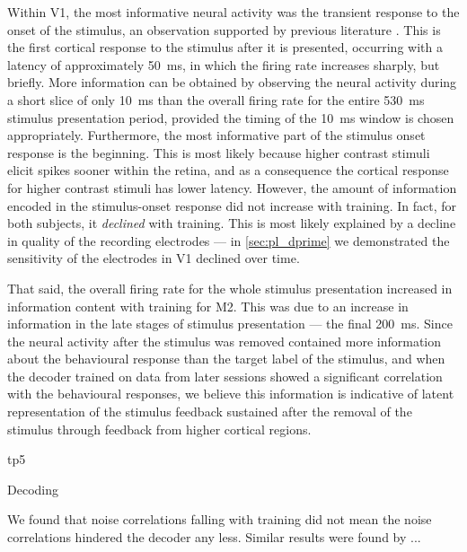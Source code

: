 Within \ac{V1}, the most informative neural activity was the transient response to the onset of the stimulus, an observation supported by previous literature \citep{Muller2001}.
This is the first cortical response to the stimulus after it is presented, occurring with a latency of approximately \SI{50}{\milli\second}, in which the firing rate increases sharply, but briefly.
More information can be obtained by observing the neural activity during a short slice of only \SI{10}{\milli\second} than the overall firing rate for the entire \SI{530}{\milli\second} stimulus presentation period, provided the timing of the \SI{10}{\milli\second} window is chosen appropriately.
Furthermore, the most informative part of the stimulus onset response is the beginning.
This is most likely because higher contrast stimuli elicit spikes sooner within the retina, and as a consequence the cortical response for higher contrast stimuli has lower latency.
However, the amount of information encoded in the stimulus-onset response did not increase with training.
In fact, for both subjects, it \textit{declined} with training.
This is most likely explained by a decline in quality of the recording electrodes --- in \autoref{sec:pl_dprime} we demonstrated the sensitivity of the electrodes in \ac{V1} declined over time.

That said, the overall firing rate for the whole stimulus presentation increased in information content with training for \ac{M2}.
This was due to an increase in information in the late stages of stimulus presentation --- the final \SI{200}{\milli\second}.
Since the neural activity after the stimulus was removed contained more information about the behavioural response than the target label of the stimulus, and when the decoder trained on data from later sessions showed a significant correlation with the behavioural responses, we believe this information is indicative of latent representation of the stimulus feedback sustained after the removal of the stimulus through feedback from higher cortical regions.

tp5

Decoding

We found that noise correlations falling with training did not mean the noise correlations hindered the decoder any less.
Similar results were found by \citet{Gu2011}...

